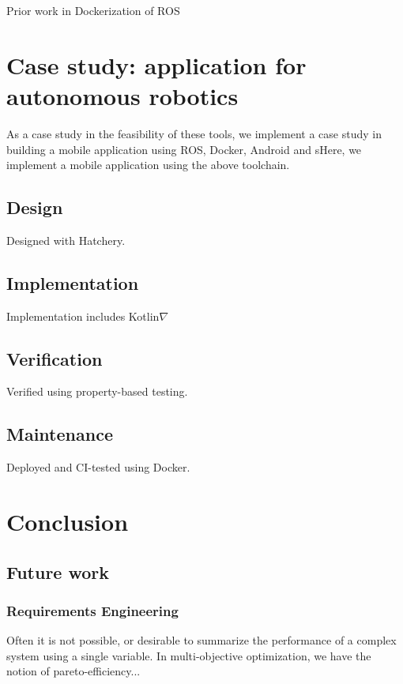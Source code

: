\documentclass[12pt,initial,twoside,maitrise]{dms}
\numberwithin{equation}{section}
\numberwithin{table}{chapter}
\numberwithin{figure}{chapter}
\begin{document}
Prior work in Dockerization of ROS \cite{white2017ros-docker}

\chapter{Case study: application for autonomous robotics}

As a case study in the feasibility of these tools, we implement a case study in building a mobile application using ROS, Docker, Android and sHere, we implement a mobile application using the above toolchain.

\section{Design}

Designed with Hatchery.

\section{Implementation}

Implementation includes Kotlin$\nabla$

\section{Verification}

Verified using property-based testing.

\section{Maintenance}

Deployed and CI-tested using Docker.

\chapter{Conclusion}\label{ch:conclusion}

\section{Future work}

\subsection{Requirements Engineering}

Often it is not possible, or desirable to summarize the performance of a complex system using a single variable. In multi-objective optimization, we have the notion of pareto-efficiency...
\end{document}
